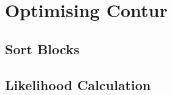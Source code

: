 \chapter{Optimising Contur}
\label{chapterlabel5}

\section{Sort Blocks}

\section{Likelihood Calculation}
